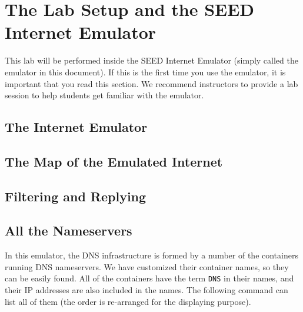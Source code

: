 \section{The Lab Setup and the SEED Internet Emulator}

This lab will be performed inside the SEED Internet Emulator (simply
called the emulator in this document). If this is the first time you
use the emulator, it is important that you read this section. 
We recommend instructors to provide a lab session to 
help students get familiar with the emulator.  


\subsection{The Internet Emulator} 






\subsection{The Map of the Emulated Internet} 





\subsection{Filtering and Replying} 





\subsection{All the Nameservers} 

In this emulator, the DNS infrastructure is formed 
by a number of the containers running DNS nameservers. 
We have customized their container names, so they can be easily found.
All of the containers have the term
\texttt{DNS} in their names, and their IP addresses 
are also included in the names. 
The following command can list all of them (the
order is re-arranged for the displaying purpose). 

